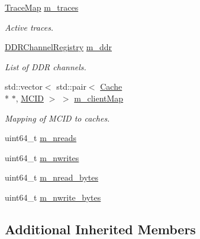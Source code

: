 \begin{DoxyCompactItemize}
\hyperlink{class_simulator_1_1_c_d_m_a_ace88d950567607d699d7ad9e9cbbb3ef}{Trace\+Map} \hyperlink{class_simulator_1_1_c_d_m_a_a077c382c9cf0488cd48c34d20351ea66}{m\+\_\+traces}
\begin{DoxyCompactList}\small\item\em Active traces. \end{DoxyCompactList}\item 
\hyperlink{class_simulator_1_1_d_d_r_channel_registry}{D\+D\+R\+Channel\+Registry} \hyperlink{class_simulator_1_1_c_d_m_a_a49092d8f924f613e08729377d051d865}{m\+\_\+ddr}
\begin{DoxyCompactList}\small\item\em List of D\+D\+R channels. \end{DoxyCompactList}\item 
std\+::vector$<$ std\+::pair$<$ \hyperlink{class_simulator_1_1_c_d_m_a_1_1_cache}{Cache} \\*
$\ast$, \hyperlink{namespace_simulator_a4b5747ff30c62c6373badf3b53b9abf7}{M\+C\+I\+D} $>$ $>$ \hyperlink{class_simulator_1_1_c_d_m_a_a2e2625307c97410a15650fb20bf99140}{m\+\_\+client\+Map}
\begin{DoxyCompactList}\small\item\em Mapping of M\+C\+I\+D to caches. \end{DoxyCompactList}\item 
uint64\+\_\+t \hyperlink{class_simulator_1_1_c_d_m_a_aac58e439ce84d5e9ee0dc904a46f5fde}{m\+\_\+nreads}
\item 
uint64\+\_\+t \hyperlink{class_simulator_1_1_c_d_m_a_a84926b887c7c4239379bd6e455480cf9}{m\+\_\+nwrites}
\item 
uint64\+\_\+t \hyperlink{class_simulator_1_1_c_d_m_a_a94eae1fc605f773ae8be9a28291428aa}{m\+\_\+nread\+\_\+bytes}
\item 
uint64\+\_\+t \hyperlink{class_simulator_1_1_c_d_m_a_a7761550a20a451aaca8a77f2afc883d5}{m\+\_\+nwrite\+\_\+bytes}
\end{DoxyCompactItemize}
\subsection*{Additional Inherited Members}


